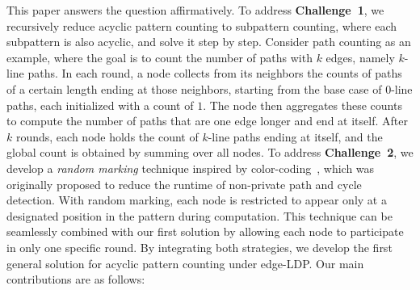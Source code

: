 This paper answers the question affirmatively. 
To address \textbf{Challenge~1}, we 
recursively reduce acyclic pattern counting to subpattern counting, where each subpattern is also acyclic, and solve it step by step.
Consider path counting as an example, where the goal is to count the number of paths with $k$ edges, namely $k$-line paths. 
In each round, a node collects from its neighbors the counts of paths of a certain length ending at those neighbors, starting from the base case of $0$-line paths, each initialized with a count of $1$. 
The node then aggregates these counts to compute the number of paths that are one edge longer and end at itself.
After $k$ rounds, each node holds the count of $k$-line paths ending at itself, and the global count is obtained by summing over all nodes. 
To address \textbf{Challenge~2}, {we develop a \emph{random marking} technique inspired by color-coding~\cite{alon1995color}, which was originally proposed to reduce the runtime of non-private path and cycle detection.}
With random marking, each node is restricted to appear only at a designated position in the pattern during computation. 
This technique can be seamlessly combined with our first solution by allowing each node to participate in only one specific round. 
By integrating both strategies, we develop the first general solution for acyclic pattern counting under edge-LDP. 
Our main contributions are as follows:






